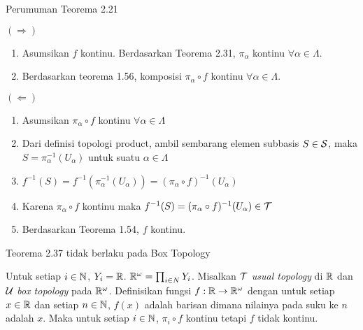 \begin{frame}{Perumuman Teorema 2.21}
    \begin{tcolorbox}[enhanced,title=Teorema 2.37 (Bukti), frame style tile={width=\paperwidth}{\wallpaper}]
        $(\Rightarrow)$
        \begin{enumerate}
            \item Asumsikan $f$ kontinu. Berdasarkan Teorema 2.31, $\pi_\alpha$ kontinu $\forall \alpha\in\Lambda$.
            \item Berdasarkan teorema 1.56, komposisi $\pi_\alpha\circ f$ kontinu $\forall\alpha\in\Lambda$.
        \end{enumerate}
        $(\Leftarrow)$
        \begin{enumerate}
            \item Asumsikan $\pi_\alpha\circ f$ kontinu $\forall \alpha \in \Lambda$
            \item Dari definisi topologi product, ambil sembarang elemen subbasis $S\in\mathcal{S}$, maka
            $S = \pi_\alpha^{-1}(U_\alpha)$ untuk suatu $\alpha\in\Lambda$
            \item $f^{-1}(S) = f^{-1}(\pi_\alpha^{-1}(U_\alpha))=(\pi_\alpha\circ f)^{-1}(U_\alpha)$
            \item Karena $\pi_\alpha\circ f$ kontinu maka $f^{-1}(S)=(\pi_\alpha\circ f)^{-1}(U_\alpha)\in\mathcal{T}$
            \item Berdasarkan Teorema 1.54, $f$ kontinu.
        \end{enumerate}
    \end{tcolorbox}
\end{frame}

\begin{frame}{Teorema 2.37 tidak berlaku pada Box Topology}
    \begin{tcolorbox}[enhanced,title=Contoh 11, frame style tile={width=\paperwidth}{\wallpaper}]
        Untuk setiap $i\in \mathbb{N}$, $Y_i=\mathbb{R}$. $\mathbb{R}^{\omega} = \prod_{i \in N}Y_i$. Misalkan $\mathcal{T}$ \textit{usual topology}
        di $\mathbb{R}$ dan $\mathcal{U}$ \textit{box topology} pada $\mathbb{R}^{\omega}$. Definisikan fungsi $f:\mathbb{R}\to\mathbb{R}^{\omega}$ dengan
        untuk setiap $x \in \mathbb{R}$ dan setiap $n \in \mathbb{N}$, $f(x)$ adalah barisan dimana nilainya pada suku ke $n$ adalah $x$. 
        Maka untuk setiap $i \in \mathbb{N}$, $\pi_i \circ f$ kontinu tetapi $f$ tidak kontinu.
    \end{tcolorbox}
\end{frame}


